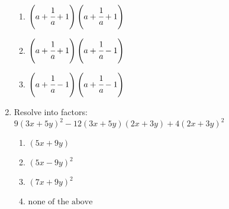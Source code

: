 \begin{multicols}{2}
\begin{enumerate}[label={\arabic*.}]
\begin{enumerate}[label={\Alph*.}]
	\item \(\left(a + \cfrac{1}{a} + 1\right) \left(a+ \cfrac{1}{a} + 1\right) \)
	\item \(\left(a + \cfrac{1}{a} + 1\right) \left(a+ \cfrac{1}{a} - 1\right)\)
	\item \(\left(a + \cfrac{1}{a} - 1\right) \left(a+ \cfrac{1}{a} - 1\right)\)
	\end{enumerate}
\item Resolve into factors: $9(3x + 5y)^2 - 12(3x + 5y)(2x + 3y) + 4(2x + 3y)^2$
	\begin{enumerate}[label={\Alph*.}]
	\item \((5x + 9y)\)
	\item \((5x - 9y)^2\)
	\item \((7x + 9y)^2\)
	\item \( \text{none of the above}\)
	\end{enumerate}



\end{enumerate}
\end{multicols}
